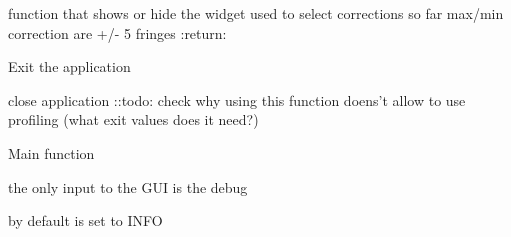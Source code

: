 \documentclass[letterpaper,10pt,english]{sphinxmanual}
\begin{document}
\begin{fulllineitems}
\begin{fulllineitems}
\begin{quote}
\begin{description}
\end{description}\end{quote}

\end{fulllineitems}


\begin{fulllineitems}
\label{Cormat_main:Cormat_main.CORMAT_GUI.show_kb}
function that shows or hide the widget used to select corrections
so far max/min correction are +/- 5 fringes
:return:

\end{fulllineitems}


\begin{fulllineitems}
\label{Cormat_main:Cormat_main.CORMAT_GUI.handle_exit_button}
Exit the application

\end{fulllineitems}


\begin{fulllineitems}
\label{Cormat_main:Cormat_main.CORMAT_GUI.handle_yes_exit}
close application
::todo: check why using this function doens't allow to use profiling (what exit values does it need?)

\end{fulllineitems}


\end{fulllineitems}


\begin{fulllineitems}
\label{Cormat_main:Cormat_main.main}
Main function

the only input to the GUI is the debug

by default is set to INFO

\end{fulllineitems}


\begin{fulllineitems}
\label{Cormat_main:Cormat_main.bin_}
\end{fulllineitems}
\end{document}
